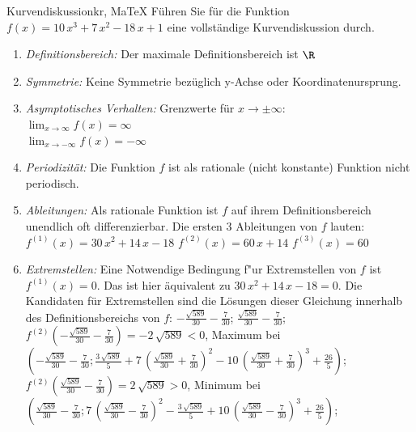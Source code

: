  \providecommand{\MoIl}{(} 
 \providecommand{\MoIr}{)}
 \providecommand{\MIntvlSep}{;} 
 \providecommand{\MElSetSep}{;} 
 \begin{MAufgabe}{Kurvendiskussion}{kr, MaTeX}
 F\"uhren Sie f\"ur die Funktion $f(x)=10\, x^3 + 7\, x^2 - 18\, x + 1$ eine vollst\"andige Kurvendiskussion durch.\\ 
 \ifLsg\Loesung
 \begin{enumerate}
 \item \emph{Definitionsbereich:} 
 Der maximale Definitionsbereich ist $\R$\item \emph{Symmetrie:} 
 Keine Symmetrie bez\"uglich y-Achse oder Koordinatenursprung.\item \emph{Asymptotisches Verhalten:} 
 Grenzwerte f\"ur $x\rightarrow \pm \infty$: \\ 
 $\lim_{x\rightarrow \infty} f(x)=\infty$ \\ 
 $\lim_{x\rightarrow -\infty} f(x)=- \infty$ \\ 
 \item \emph{Periodizit\"at:} 
 Die Funktion $f$ ist als rationale (nicht konstante) Funktion nicht periodisch.\item \emph{Ableitungen:} 
 Als rationale Funktion ist $f$ auf ihrem Definitionsbereich unendlich oft differenzierbar. 
 Die ersten 3 Ableitungen von $f$ lauten: \\ 
 $f^{(1)}(x)=30\, x^2 + 14\, x - 18$\newline 
  $f^{(2)}(x)=60\, x + 14$\newline 
  $f^{(3)}(x)=60$\newline 
  \item \emph{Extremstellen:} 
 Eine Notwendige Bedingung f"ur Extremstellen von $f$ ist $f^{(1)}(x)=0$. 
 Das ist hier \"aquivalent zu $30\, x^2 + 14\, x - 18=0$. 
 Die Kandidaten f\"ur Extremstellen sind die L\"osungen dieser Gleichung innerhalb des Definitionsbereichs von $f$: $ - \frac{\sqrt{589}}{30} - \frac{7}{30}$; $\frac{\sqrt{589}}{30} - \frac{7}{30}$; \\ 
 $f^{(2)}( - \frac{\sqrt{589}}{30} - \frac{7}{30})=- 2\, \sqrt{589}$$<0$, Maximum bei $( - \frac{\sqrt{589}}{30} - \frac{7}{30};\frac{3\, \sqrt{589}}{5} + 7\, {\left(\frac{\sqrt{589}}{30} + \frac{7}{30}\right)}^2 - 10\, {\left(\frac{\sqrt{589}}{30} + \frac{7}{30}\right)}^3 + \frac{26}{5})$; \\ 
 $f^{(2)}(\frac{\sqrt{589}}{30} - \frac{7}{30})=2\, \sqrt{589}$$>0$, Minimum bei $(\frac{\sqrt{589}}{30} - \frac{7}{30};7\, {\left(\frac{\sqrt{589}}{30} - \frac{7}{30}\right)}^2 - \frac{3\, \sqrt{589}}{5} + 10\, {\left(\frac{\sqrt{589}}{30} - \frac{7}{30}\right)}^3 + \frac{26}{5})$; \\ 

\end{enumerate}
\end{MAufgabe}
